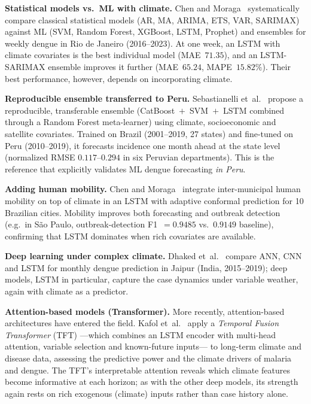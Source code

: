 \documentclass[runningheads]{llncs}
\begin{document}
\textbf{Statistical models vs.\ ML with climate.}
Chen and Moraga~\cite{chen2025rio} systematically compare classical statistical models
(AR, MA, ARIMA, ETS, VAR, SARIMAX) against ML (SVM, Random Forest, XGBoost, LSTM, Prophet)
and ensembles for weekly dengue in Rio de Janeiro (2016--2023). At one week, an LSTM with
climate covariates is the best individual model (MAE~$71.35$), and an LSTM-SARIMAX ensemble
improves it further (MAE~$65.24$, MAPE~$15.82\%$). Their best performance, however, depends
on incorporating climate.

\textbf{Reproducible ensemble transferred to Peru.}
Sebastianelli et~al.~\cite{sebastianelli2024} propose a reproducible, transferable
ensemble (CatBoost~$+$~SVM~$+$~LSTM combined through a Random Forest meta-learner) using
climate, socioeconomic and satellite covariates. Trained on Brazil (2001--2019, 27 states)
and fine-tuned on Peru (2010--2019), it forecasts incidence one month ahead at the state
level (normalized RMSE $0.117$--$0.294$ in six Peruvian departments). This is the reference
that explicitly validates ML dengue forecasting \emph{in Peru}.

\textbf{Adding human mobility.}
Chen and Moraga~\cite{chen2025mobility} integrate inter-municipal human mobility on top of
climate in an LSTM with adaptive conformal prediction for 10 Brazilian cities. Mobility
improves both forecasting and outbreak detection (e.g.\ in S\~ao Paulo, outbreak-detection
F1~$=0.9485$ vs.\ $0.9149$ baseline), confirming that LSTM dominates when rich covariates
are available.

\textbf{Deep learning under complex climate.}
Dhaked et~al.~\cite{dhaked2025} compare ANN, CNN and LSTM for monthly dengue prediction in
Jaipur (India, 2015--2019); deep models, LSTM in particular, capture the case dynamics
under variable weather, again with climate as a predictor.

\textbf{Attention-based models (Transformer).}
More recently, attention-based architectures have entered the field. Kafol et~al.\
\cite{tft2026} apply a \emph{Temporal Fusion Transformer} (TFT) ---which combines an LSTM
encoder with multi-head attention, variable selection and known-future inputs--- to
long-term climate and disease data, assessing the predictive power and the climate drivers
of malaria and dengue. The TFT's interpretable attention reveals which climate features
become informative at each horizon; as with the other deep models, its strength again
rests on rich exogenous (climate) inputs rather than case history alone.
\end{document}
